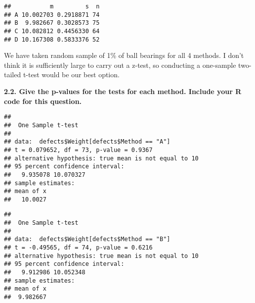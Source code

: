 \documentclass[
]{article}
\newenvironment{Shaded}{\begin{snugshade}}{\end{snugshade}}
\newcommand{\AttributeTok}[1]{\textcolor[rgb]{0.77,0.63,0.00}{#1}}
\newcommand{\DecValTok}[1]{\textcolor[rgb]{0.00,0.00,0.81}{#1}}
\newcommand{\FunctionTok}[1]{\textcolor[rgb]{0.00,0.00,0.00}{#1}}
\newcommand{\NormalTok}[1]{#1}
\newcommand{\SpecialCharTok}[1]{\textcolor[rgb]{0.00,0.00,0.00}{#1}}
\newcommand{\StringTok}[1]{\textcolor[rgb]{0.31,0.60,0.02}{#1}}
\begin{document}
\begin{verbatim}
##           m         s  n
## A 10.002703 0.2918871 74
## B  9.982667 0.3028573 75
## C 10.082812 0.4456330 64
## D 10.167308 0.5833376 52
\end{verbatim}

We have taken random sample of 1\% of ball bearings for all 4 methods. I
don't think it is sufficiently large to carry out a z-test, so
conducting a one-sample two-tailed t-test would be our best option.

\textbf{2.2. Give the p-values for the tests for each method. Include
your R code for this question.}

\begin{Shaded}
\end{Shaded}

\begin{verbatim}
## 
##  One Sample t-test
## 
## data:  defects$Weight[defects$Method == "A"]
## t = 0.079652, df = 73, p-value = 0.9367
## alternative hypothesis: true mean is not equal to 10
## 95 percent confidence interval:
##   9.935078 10.070327
## sample estimates:
## mean of x 
##   10.0027
\end{verbatim}

\begin{Shaded}
\end{Shaded}

\begin{verbatim}
## 
##  One Sample t-test
## 
## data:  defects$Weight[defects$Method == "B"]
## t = -0.49565, df = 74, p-value = 0.6216
## alternative hypothesis: true mean is not equal to 10
## 95 percent confidence interval:
##   9.912986 10.052348
## sample estimates:
## mean of x 
##  9.982667
\end{verbatim}
\end{document}
